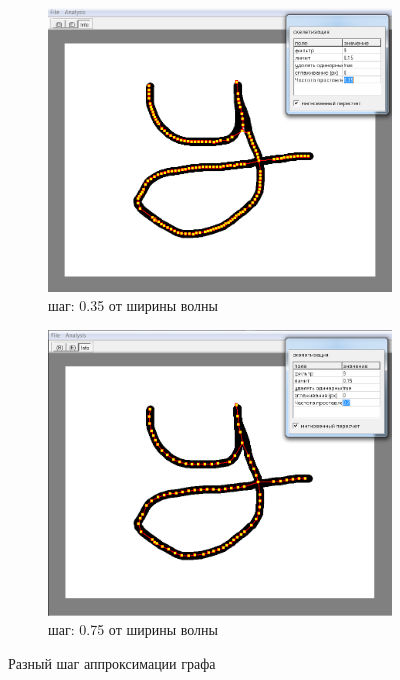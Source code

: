\begin{figure}[h]
	\begin{subfigure}{.5\textwidth}
		\includegraphics[width=\linewidth]{images/an_convertor_graph_2.png}
		\caption{шаг: 0.35 от ширины волны}
	\end{subfigure}
	\begin{subfigure}{.5\textwidth}
		\includegraphics[width=\linewidth]{images/an_convertor_graph_1.png}
		\caption{шаг: 0.75 от ширины волны}
	\end{subfigure}
	\caption{Разный шаг аппроксимации графа}
\end{figure}

